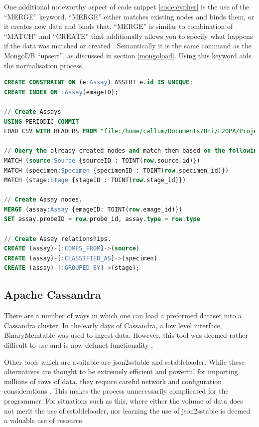 One additional noteworthy aspect of code snippet \ref{code:cypher} is the use of the ``MERGE'' keyword. ``MERGE'' either matches existing nodes and binds them, or it creates new data and binds that. ``MERGE'' is similar to combination of ``MATCH'' and ``CREATE'' that additionally allows you to specify what happens if the data was matched or created \cite{nd}. Semantically it is the same command as the MongoDB ``upsert'', as discussed in section \ref{mongoload}. Using this keyword aids the normalisation process.
\newpage
\vspace*{\fill}
\begin{lstlisting}[language=SQL, caption=Cypher file created to load assay data into the Neo4j data model., label=code:cypher]
CREATE CONSTRAINT ON (e:Assay) ASSERT e.id IS UNIQUE;
CREATE INDEX ON :Assay(emageID);

// Create Assays
USING PERIODIC COMMIT
LOAD CSV WITH HEADERS FROM "file:/home/callum/Documents/Uni/F20PA/Project/Neo4j/Data/Assays.csv" AS row

// Query the already created nodes and match them based on the following clauses.
MATCH (source:Source {sourceID : TOINT(row.source_id)})
MATCH (specimen:Specimen {specimenID : TOINT(row.specimen_id)})
MATCH (stage:Stage {stageID : TOINT(row.stage_id)})

// Create Assay nodes.
MERGE (assay:Assay {emageID: TOINT(row.emage_id)})
SET assay.probeID = row.probe_id, assay.type = row.type

// Create Assay relationships.
CREATE (assay)-[:COMES_FROM]->(source)
CREATE (assay)-[:CLASSIFIED_AS]->(specimen)
CREATE (assay)-[:GROUPED_BY]->(stage);
\end{lstlisting}
\vspace*{\fill}
\newpage

\subsection{Apache Cassandra}
There are a number of ways in which one can load a preformed dataset into a Cassandra cluster. In the early days of Cassandra, a low level interface, BinaryMemtable was used to ingest data. However, this tool was deemed rather difficult to use and is now defunct functionality \cite{cass}.

Other tools which are available are json2sstable and sstableloader. While these alternatives are thought to be extremely efficient and powerful for importing millions of rows of data, they require careful network and configuration considerations \cite{cass}. This makes the process unnecessarily complicated for the programmer. For situations such as this, where either the volume of data does not merit the use of sstableloader, nor learning the use of json2sstable is deemed a valuable use of resource.


